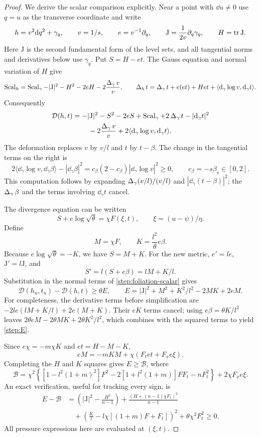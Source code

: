 \begin{proof}
We derive the scalar comparison explicitly.  Near a point with $\dd u\ne0$
use $q=u$ as the transverse coordinate and write
\[
 h=v^2\mathrm d q^2+\gamma_q,\qquad v=1/s,\qquad
 e=v^{-1}\partial_q,\qquad
 \mathrm J=\frac1{2v}\partial_q\gamma_q,\qquad H=\operatorname{tr}\mathrm J.
\]
Here $\mathrm J$ is the second fundamental form of the level sets,
and all tangential norms and derivatives below use $\gamma_q$.
Put $S=H-et$.  The Gauss equation and normal variation of $H$ give
\[
 \operatorname{Scal}_h=\operatorname{Scal}_{\gamma}-|\mathrm J|^2-H^2-2eH
              -2\frac{\operatorname{\Delta}_{\gamma}v}{v},
 \qquad
 \operatorname{\Delta}_ht=\operatorname{\Delta}_{\gamma}t+e(et)+H et
           +\langle\mathrm d_\gamma\log v,\mathrm d_\gamma t\rangle.
\]
Consequently
\begin{align}
 \mathcal D(h,t)
 &=-|\mathrm J|^2-S^2-2eS+\operatorname{Scal}_\gamma
    +2\operatorname{\Delta}_\gamma t-|\mathrm d_\gamma t|^2\notag\\
 &\hspace{8mm}-2\frac{\operatorname{\Delta}_\gamma v}{v}
    +2\langle\mathrm d_\gamma\log v,\mathrm d_\gamma t\rangle.
 \label{step:foliation-scalar}
\end{align}
The deformation replaces $v$ by $v/l$ and $t$ by $t-\beta$.
The change in the tangential terms on the right is
\[
 2\langle\dd_\gamma\log v,\dd_\gamma\beta\rangle
       -|\dd_\gamma\beta|^2
 =c_\beta(2-c_\beta)|\dd_\gamma\log v|^2\ge0,
 \qquad c_\beta=-s\beta_s\in[0,2].
\]
This computation follows by expanding
$\operatorname{\Delta}_\gamma(v/l)/(v/l)$ and $|\dd_\gamma(t-\beta)|^2$;
the $\operatorname{\Delta}_\gamma\beta$ and the terms involving $\dd_\gamma t$ cancel.

The divergence equation can be written
\[
 S+e\log\sqrt\theta=\chi F(\xi,t),\qquad
 \xi=(u-\psi)/\eta.
\]
Define
\[
 M=\chi F,\qquad K=\frac{l^2}{\theta}e\beta.
\]
Because $e\log\sqrt\theta=-K$, we have $S=M+K$.
For the new metric, $e'=le$, $\mathrm J'=l\mathrm J$, and
\[
 S'=l(S+e\beta)=lM+K/l.
\]
Substitution in the normal terms of \cref{step:foliation-scalar} gives
\begin{equation}\label{step:E}
 \mathcal D(h_u,t_u)-\mathcal D(h,t)\ge\theta E,
 \qquad E=|\mathrm J|^2+M^2+K^2/l^2-2MK+2eM.
\end{equation}
For completeness, the derivative terms before simplification are
$-2le(lM+K/l)+2e(M+K)$.  Their $eK$ terms cancel; using
$e\beta=\theta K/l^2$ leaves $2\theta eM-2\theta MK+
2\theta K^2/l^2$, which combines with the squared terms to yield
\cref{step:E}.

Since $e\chi=-m\chi K$ and $et=H-M-K$,
\[
 eM=-mKM+\chi(F_t et+F_xe\xi).
\]
Completing the $H$ and $K$ squares gives $E\ge\mathcal B$, where
\begin{equation}\label{step:B}
 \mathcal B=\chi^2\left\{
 [1-l^2(1+m)^2]F^2
 -2[1+l^2(1+m)]FF_t-nF_t^2\right\}
 +2\chi F_xe\xi.
\end{equation}
An exact verification, useful for tracking every sign, is
\begin{align*}
 E-\mathcal B
 &=\left(|\mathrm J|^2-\frac{H^2}{n-1}\right)
 +\frac{(H+(n-1)\chi F_t)^2}{n-1}\\
 &\quad+\left(\frac K l-l\chi[(1+m)F+F_t]\right)^2
 +\theta\chi^2F_t^2\ge0.
\end{align*}
All pressure expressions here are evaluated at $(\xi,t)$.


\end{proof}
